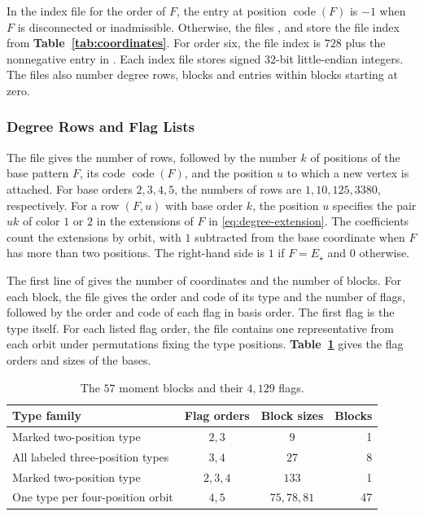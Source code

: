 In the index file for the order of $F$, the entry at position
$\operatorname{code}(F)$ is $-1$ when $F$ is disconnected or
inadmissible. Otherwise, the files , 
and  store the file index from
\textbf{Table~\ref{tab:coordinates}}. For order six, the file index
is $728$ plus the nonnegative entry in
. Each index file stores signed
32-bit little-endian integers. The files also number degree rows,
blocks and entries within blocks starting at zero.

\subsubsection{Degree Rows and Flag Lists}\label{app:flag-lists}

The file  gives the number of rows, followed by
the number $k$ of positions of the base pattern $F$, its code
$\operatorname{code}(F)$, and the position $u$ to which a new vertex is
attached.
For base orders $2,3,4,5$, the numbers of rows are $1,10,125,3380$,
respectively. For a row $(F,u)$ with base order $k$, the position $u$
specifies the pair $uk$ of color $1$ or $2$ in the extensions of
$F$ in \eqref{eq:degree-extension}. The coefficients count the
extensions by orbit, with $1$ subtracted from the base coordinate
when $F$ has more than two positions. The right-hand side is $1$
if $F=E_\star$ and $0$ otherwise.

The first line of  gives the number of coordinates and
the number of blocks. For each block, the file gives the order and code
of its type and the number of flags, followed by the order and code of
each flag in basis order. The first flag is the type itself. For each
listed flag order, the file contains one representative from each orbit
under permutations fixing the type positions.
\textbf{Table~\ref{tab:blocks}} gives the flag orders and sizes of the
bases.

\begin{table}[htbp]
\centering
\caption{The $57$ moment blocks and their $4{,}129$ flags.}
\label{tab:blocks}
\begin{tabular}{@{}lccr@{}}
\toprule
Type family & Flag orders & Block sizes & Blocks\\
\midrule
Marked two-position type & $2,3$ & $9$ & 1\\
All labeled three-position types & $3,4$ & $27$ & 8\\
Marked two-position type & $2,3,4$ & $133$ & 1\\
One type per four-position orbit & $4,5$ & $75,78,81$ & 47\\
\bottomrule
\end{tabular}
\end{table}

